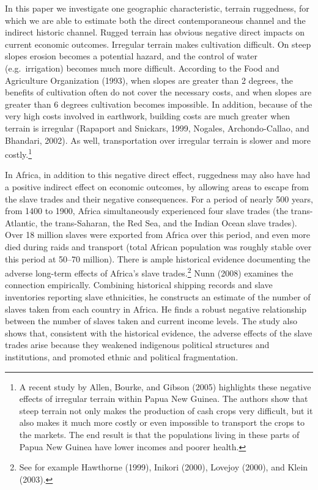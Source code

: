 \documentclass[
  letterpaper,
  DIV=11,
  numbers=noendperiod]{scrartcl}
\begin{document}
In this paper we investigate one geographic characteristic, terrain
ruggedness, for which we are able to estimate both the direct
contemporaneous channel and the indirect historic channel. Rugged
terrain has obvious negative direct impacts on current economic
outcomes. Irregular terrain makes cultivation difficult. On steep slopes
erosion becomes a potential hazard, and the control of water
(e.g.~irrigation) becomes much more difficult. According to the Food and
Agriculture Organization (1993), when slopes are greater than 2 degrees,
the benefits of cultivation often do not cover the necessary costs, and
when slopes are greater than 6 degrees cultivation becomes impossible.
In addition, because of the very high costs involved in earthwork,
building costs are much greater when terrain is irregular (Rapaport and
Snickars, 1999, Nogales, Archondo-Callao, and Bhandari, 2002). As well,
transportation over irregular terrain is slower and more
costly.\footnote{A recent study by Allen, Bourke, and Gibson (2005)
  highlights these negative effects of irregular terrain within Papua
  New Guinea. The authors show that steep terrain not only makes the
  production of cash crops very difficult, but it also makes it much
  more costly or even impossible to transport the crops to the markets.
  The end result is that the populations living in these parts of Papua
  New Guinea have lower incomes and poorer health.}

In Africa, in addition to this negative direct effect, ruggedness may
also have had a positive indirect effect on economic outcomes, by
allowing areas to escape from the slave trades and their negative
consequences. For a period of nearly 500 years, from 1400 to 1900,
Africa simultaneously experienced four slave trades (the trans-Atlantic,
the trans-Saharan, the Red Sea, and the Indian Ocean slave trades). Over
18 million slaves were exported from Africa over this period, and even
more died during raids and transport (total African population was
roughly stable over this period at 50--70 million). There is ample
historical evidence documenting the adverse long-term effects of
Africa's slave trades.\footnote{See for example Hawthorne (1999),
  Inikori (2000), Lovejoy (2000), and Klein (2003).} Nunn (2008)
examines the connection empirically. Combining historical shipping
records and slave inventories reporting slave ethnicities, he constructs
an estimate of the number of slaves taken from each country in Africa.
He finds a robust negative relationship between the number of slaves
taken and current income levels. The study also shows that, consistent
with the historical evidence, the adverse effects of the slave trades
arise because they weakened indigenous political structures and
institutions, and promoted ethnic and political fragmentation.
\end{document}

